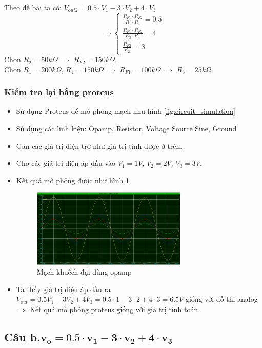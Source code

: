 				\hspace*{0.6cm}Theo đề bài ta có: $V_{out2} = 0.5 \cdot V_1 - 3 \cdot V_2 + 4 \cdot V_3$
				\[
				\Rightarrow
				\begin{cases}
					\frac{R_{F1} \cdot R_{F2}}{R_1 \cdot R_4} = 0.5\\
					\frac{R_{F1} \cdot R_{F2}}{R_3 \cdot R_4} = 4\\
					\frac{R_{F2}}{R_2} = 3
				\end{cases}
				\]
				\hspace*{0.6cm}Chọn $R_{2} = 50k\Omega$ $\Rightarrow$ $R_{F2} = 150k\Omega$.\\
				\hspace*{0.6cm}Chọn $R_{1} = 200k\Omega$, $R_{4} = 150k\Omega$ $\Rightarrow$ $R_{F1} = 100k\Omega$ $\Rightarrow$ $R_3 = 25k\Omega$.\\
			\newpage
			\subsubsection{Kiểm tra lại bằng proteus}
				\begin{itemize}
					\item Sử dụng Proteus để mô phỏng mạch như hình \ref{fig:circuit_simulation}
					\item Sử dụng các linh kiện: Opamp, Resistor, Voltage Source Sine, Ground
					\item Gán các giá trị điện trở như giá trị tính được ở trên.
					\item Cho các giá trị điện áp đầu vào $V_1 = 1V$, $V_2 = 2V$, $V_3 = 3V$.
					\item Kết quả mô phỏng được như hình \ref{fig:result_simulation}
					\begin{figure}[H]
						\centering
						\includegraphics[width=0.7\textwidth]{pictures/result1_a.png}
						\caption{Mạch khuếch đại dùng opamp}					
						\label{fig:result_simulation}
					\end{figure}
					\item Ta thấy giá trị điện áp đầu ra $V_{out} = 0.5V_1 - 3V_2 + 4V_3 = 0.5 \cdot 1 - 3 \cdot 2 + 4 \cdot 3 = 6.5V$ giống với đồ thị analog $\Rightarrow$ Kết quả mô phỏng proteus giống với giá trị tính toán.
				\end{itemize}
		\subsection{Câu b.$\mathbf{v_o = 0.5 \cdot v_1 - 3 \cdot v_2 + 4 \cdot v_3}$}